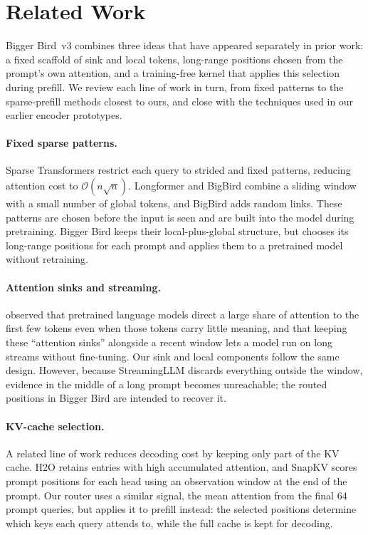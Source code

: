 \documentclass[11pt]{article}
\newcommand{\bigO}{\mathcal{O}}
\begin{document}
\section{Related Work}
\label{sec:related}

Bigger Bird~v3 combines three ideas that have appeared separately in prior
work: a fixed scaffold of sink and local tokens, long-range positions chosen
from the prompt's own attention, and a training-free kernel that applies this
selection during prefill. We review each line of work in turn, from fixed
patterns to the sparse-prefill methods closest to ours, and close with the
techniques used in our earlier encoder prototypes.

\paragraph{Fixed sparse patterns.}
Sparse Transformers \citep{child2019sparse} restrict each query to strided
and fixed patterns, reducing attention cost to $\bigO(n\sqrt{n})$. Longformer
\citep{beltagy2020longformer} and BigBird \citep{zaheer2020bigbird} combine a
sliding window with a small number of global tokens, and BigBird adds random
links. These patterns are chosen before the input is seen and are built into
the model during pretraining. Bigger Bird keeps their local-plus-global
structure, but chooses its long-range positions for each prompt and applies
them to a pretrained model without retraining.

\paragraph{Attention sinks and streaming.}
\citet{xiao2024streamingllm} observed that pretrained language models direct
a large share of attention to the first few tokens even when those tokens
carry little meaning, and that keeping these ``attention sinks'' alongside a
recent window lets a model run on long streams without fine-tuning. Our sink
and local components follow the same design. However, because StreamingLLM
discards everything outside the window, evidence in the middle of a long
prompt becomes unreachable; the routed positions in Bigger Bird are intended
to recover it.

\paragraph{KV-cache selection.}
A related line of work reduces decoding cost by keeping only part of the KV
cache. H2O \citep{zhang2023h2o} retains entries with high accumulated
attention, and SnapKV \citep{li2024snapkv} scores prompt positions for each
head using an observation window at the end of the prompt. Our router uses a
similar signal, the mean attention from the final 64 prompt queries, but
applies it to prefill instead: the selected positions determine which keys
each query attends to, while the full cache is kept for decoding.
\end{document}
